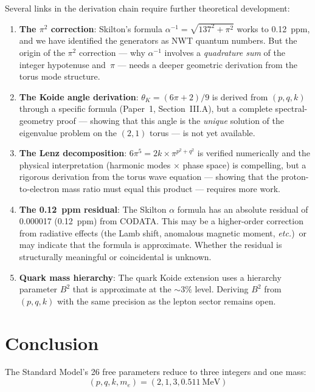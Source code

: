\documentclass[11pt,a4paper]{article}
\begin{document}
Several links in the derivation chain require further theoretical development:
\begin{enumerate}
  \item \textbf{The $\pi^2$ correction}: Skilton's formula $\alpha^{-1} = \sqrt{137^2 + \pi^2}$ works to 0.12~ppm, and we have identified the generators as NWT quantum numbers. But the origin of the $\pi^2$ correction --- why $\alpha^{-1}$ involves a \emph{quadrature sum} of the integer hypotenuse and~$\pi$ --- needs a deeper geometric derivation from the torus mode structure.

  \item \textbf{The Koide angle derivation}: $\theta_K = (6\pi+2)/9$ is derived from $(p, q, k)$ through a specific formula (Paper~1, Section~III.A), but a complete spectral-geometry proof --- showing that this angle is the \emph{unique} solution of the eigenvalue problem on the $(2,1)$ torus --- is not yet available.

  \item \textbf{The Lenz decomposition}: $6\pi^5 = 2k \times \pi^{p^2+q^2}$ is verified numerically and the physical interpretation (harmonic modes $\times$ phase space) is compelling, but a rigorous derivation from the torus wave equation --- showing that the proton-to-electron mass ratio must equal this product --- requires more work.

  \item \textbf{The 0.12~ppm residual}: The Skilton $\alpha$ formula has an absolute residual of 0.000017 (0.12~ppm) from CODATA. This may be a higher-order correction from radiative effects (the Lamb shift, anomalous magnetic moment, \emph{etc.})\ or may indicate that the formula is approximate. Whether the residual is structurally meaningful or coincidental is unknown.

  \item \textbf{Quark mass hierarchy}: The quark Koide extension uses a hierarchy parameter $B^2$ that is approximate at the ${\sim}3\%$ level. Deriving $B^2$ from $(p, q, k)$ with the same precision as the lepton sector remains open.
\end{enumerate}

\section{Conclusion}
\label{sec:conclusion}

The Standard Model's 26 free parameters reduce to three integers and one mass:
\begin{equation}
  (p, q, k, m_e) = (2, 1, 3, 0.511~\text{MeV})
\end{equation}
\end{document}
